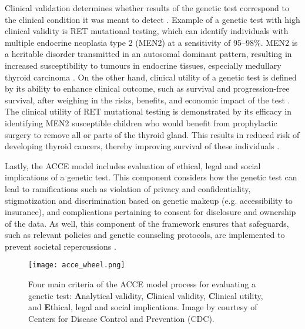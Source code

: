 Clinical validation determines whether results of the genetic test correspond to the clinical condition it was meant to detect \cite{Sanderson2005, Zimmern2007}. Example of a genetic test with high clinical validity is \acs{RET} mutational testing, which can identify individuals with multiple endocrine neoplasia type 2 (\acs{MEN2}) at a sensitivity of 95--98\%. MEN2 is a heritable disorder transmitted in an autosomal dominant pattern, resulting in increased susceptibility to tumours in endocrine tissues, especially medullary thyroid carcinoma \cite{Burke2014}. On the other hand, clinical utility of a genetic test is defined by its ability to enhance clinical outcome, such as survival and progression-free survival, after weighing in the risks, benefits, and economic impact of the test \cite{Sanderson2005, Zimmern2007}. The clinical utility of \acs{RET} mutational testing is demonstrated by its efficacy in identifying MEN2 susceptible children who would benefit from prophylactic surgery to remove all or parts of the thyroid gland. This results in reduced risk of developing thyroid cancers, thereby improving survival of these individuals \cite{Burke2014}.

Lastly, the ACCE model includes evaluation of ethical, legal and social implications of a genetic test. This component considers how the genetic test can lead to ramifications such as violation of privacy and confidentiality, stigmatization and discrimination based on genetic makeup (e.g. accessibility to insurance), and complications pertaining to consent for disclosure and ownership of the data. As well, this component of the framework ensures that safeguards, such as relevant policies and genetic counseling protocols, are implemented to prevent societal repercussions \cite{Sanderson2005, Zimmern2007}.


\begin{figure}[H]
	\centering
	\texttt{[image: acce\_wheel.png]}
	\caption[Four main criteria of the ACCE model process for evaluating a genetic test: \textbf{A}nalytical validity, \textbf{C}linical validity, \textbf{C}linical utility, and \textbf{E}thical, legal and social implications.]{Four main criteria of the ACCE model process for evaluating a genetic test: \textbf{A}nalytical validity, \textbf{C}linical validity, \textbf{C}linical utility, and \textbf{E}thical, legal and social implications. Image by courtesy of Centers for Disease Control and Prevention (\acs{CDC}).}
	\label{fig:acce_wheel}
\end{figure}

